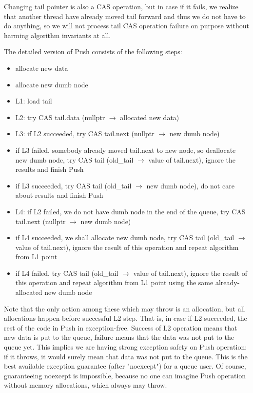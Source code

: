 \documentclass{article}
\begin{document}
Changing tail pointer is also a CAS operation, but in case if it fails, we realize that another thread have already moved tail forward and thus we do not have to do anything, so we will not process tail CAS operation failure on purpose without harming algorithm invariants at all.

The detailed version of Push consists of the following steps:
\begin{itemize}
	\item allocate new data
	\item allocate new dumb node
	\item L1: load tail
	\item L2: try CAS tail.data (nullptr $\rightarrow$ allocated new data)
	\item L3: if L2 succeeded, try CAS tail.next (nullptr $\rightarrow$ new dumb node)
	\item if L3 failed, somebody already moved tail.next to new node, so deallocate new dumb node, try CAS tail (old\_tail $\rightarrow$ value of tail.next), ignore the results and finish Push
	\item if L3 succeeded, try CAS tail (old\_tail $\rightarrow$ new dumb node), do not care about results and finish Push
	\item L4: if L2 failed, we do not have dumb node in the end of the queue, try CAS tail.next (nullptr $\rightarrow$ new dumb node)
	\item if L4 succeeded, we shall allocate new dumb node, try CAS tail (old\_tail $\rightarrow$ value of tail.next), ignore the result of this operation and repeat algorithm from L1 point
	\item if L4 failed, try CAS tail (old\_tail $\rightarrow$ value of tail.next), ignore the result of this operation and repeat algorithm from L1 point using the same already-allocated new dumb node
\end{itemize}

Note that the only action among these which may throw is an allocation, but all allocations happen-before successful L2 step. That is, in case if L2 succeeded, the rest of the code in Push in exception-free. Success of L2 operation means that new data is put to the queue, failure means that the data was not put to the queue yet. This implies we are having strong exception safety on Push operation: if it throws, it would surely mean that data was not put to the queue. This is the best available exception guarantee (after "noexcept") for a queue user. Of course, guaranteeing noexcept is impossible, because no one can imagine Push operation without memory allocations, which always may throw.
\end{document}
